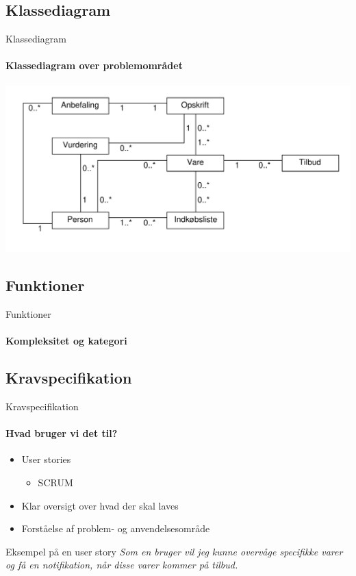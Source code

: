 \subsection{Klassediagram}
\begin{frame}{Klassediagram}
	\framesubtitle{Klassediagram over problemområdet}
	\includegraphics[width=1\textwidth]{images/klassediagram_model_simple.pdf}
\end{frame}

\subsection{Funktioner}
\begin{frame}{Funktioner}
	\framesubtitle{Kompleksitet og kategori}
	
\end{frame}

\subsection{Kravspecifikation}
\begin{frame}{Kravspecifikation}
	\framesubtitle{Hvad bruger vi det til?}
	\begin{itemize} 
    	\item User stories
    	\begin{itemize}
    		\item SCRUM
    	\end{itemize}
    	\item Klar oversigt over hvad der skal laves
    	\item Forståelse af problem- og anvendelsesområde
  	\end{itemize}
    \begin{beamerboxesrounded}[upper=headerCol,lower=bodyCol,shadow=true]{Eksempel på en user story}
    \textit{Som en bruger vil jeg kunne overvåge specifikke varer og få en notifikation, når disse
varer kommer på tilbud.}
    \end{beamerboxesrounded}
\end{frame}

